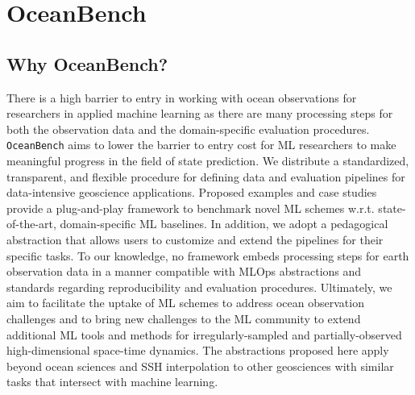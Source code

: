 \section{OceanBench} \label{sec:oceanbench_intro}

\subsection{Why OceanBench?} \label{sec:oceanbench_why}

There is a high barrier to entry in working with ocean observations for researchers in applied machine learning as there are many processing steps for both the observation data and the domain-specific evaluation procedures. 
\texttt{OceanBench} aims to lower the barrier to entry cost for ML researchers to make meaningful progress in the field of state prediction. 
We distribute a standardized, transparent, and flexible procedure for defining data and evaluation pipelines for data-intensive geoscience applications. 
Proposed examples and case studies provide a plug-and-play framework to benchmark novel ML schemes w.r.t.  state-of-the-art, domain-specific ML baselines. 
In addition, we adopt a pedagogical abstraction that allows users to customize and extend the pipelines for their specific tasks.
To our knowledge, no framework embeds processing steps for earth observation data in a manner compatible with MLOps abstractions and standards regarding reproducibility and evaluation procedures. 
Ultimately, we aim to facilitate the uptake of ML schemes to address ocean observation challenges and to bring new challenges to the ML community to extend additional ML tools and methods for irregularly-sampled and partially-observed high-dimensional space-time dynamics.
The abstractions proposed here apply beyond ocean sciences and SSH interpolation to other geosciences with similar tasks that intersect with machine learning.




